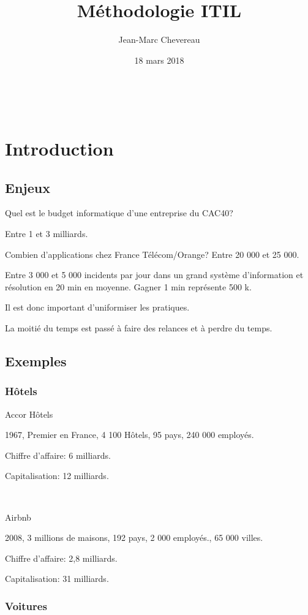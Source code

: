 \documentclass[a4paper,11pt]{article}
\title{Méthodologie ITIL}
\author{Jean-Marc Chevereau}
\date{18 mars 2018}
\newcommand{\euro}{\texteuro}
\begin{document}
\maketitle
\tableofcontents

\

\section{Introduction}

\subsection{Enjeux}

Quel est le budget informatique d'une entreprise du CAC40?

Entre 1 et 3 milliards.

Combien d'applications chez France Télécom/Orange? Entre 20 000 et 25 000.

Entre 3 000 et 5 000 incidents par jour dans un grand système d'information et
résolution en 20 min en moyenne. Gagner 1 min représente 500 k\euro .

Il est donc important d'uniformiser les pratiques.

La moitié du temps est passé à faire des relances et à perdre du temps.

\subsection{Exemples}

\subsubsection{Hôtels}

Accor Hôtels

1967, Premier en France, 4 100 Hôtels, 95 pays, 240 000 employés.

Chiffre d'affaire: 6 milliards.

Capitalisation: 12 milliards.

\

Airbnb

2008, 3 millions de maisons, 192 pays, 2 000 employés., 65 000 villes.

Chiffre d'affaire: 2,8 milliards.

Capitalisation: 31 milliards.

\subsubsection{Voitures}
\end{document}
